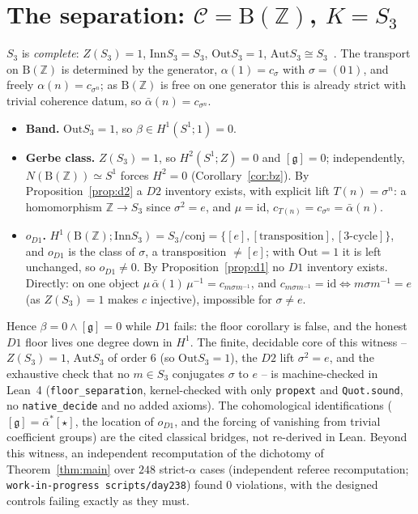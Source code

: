 \documentclass[11pt]{article}
\theoremstyle{definition}
\newcommand{\C}{\mathcal{C}}
\newcommand{\id}{\mathrm{id}}
\newcommand{\Z}{\mathbb{Z}}
\newcommand{\Aut}{\mathrm{Aut}}
\newcommand{\Inn}{\mathrm{Inn}}
\newcommand{\Out}{\mathrm{Out}}
\newcommand{\gerbe}{\mathfrak{g}}
\newcommand{\abar}{\bar{\alpha}}
\newcommand{\B}{\mathrm{B}}
\begin{document}
\section{The separation: $\C=\B(\Z)$, $K=S_3$}\label{sec:sep}

$S_3$ is \emph{complete}: $Z(S_3)=1$, $\Inn S_3=S_3$, $\Out S_3=1$, $\Aut S_3\cong
S_3$~\cite[Thm 7.5]{rotman}. The transport on $\B(\Z)$ is determined by the generator,
$\alpha(1)=c_\sigma$ with $\sigma=(0\,1)$, and freely $\alpha(n)=c_{\sigma^n}$; as $\B(\Z)$
is free on one generator this is already strict with trivial coherence datum, so
$\abar(n)=c_{\sigma^n}$.

\begin{itemize}
\item \textbf{Band.} $\Out S_3=1$, so $\beta\in H^1(S^1;1)=0$. \checkmark
\item \textbf{Gerbe class.} $Z(S_3)=1$, so $H^2(S^1;Z)=0$ and $[\gerbe]=0$; independently,
$N(\B(\Z))\simeq S^1$ forces $H^2=0$ (Corollary~\ref{cor:bz}). By
Proposition~\ref{prop:d2} a $D2$ inventory exists, with explicit lift $T(n)=\sigma^n$: a
homomorphism $\Z\to S_3$ since $\sigma^2=e$, and $\mu=\id$, $c_{T(n)}=c_{\sigma^n}=\abar(n)$.
\checkmark
\item \textbf{$o_{D1}$.} $H^1(\B(\Z);\Inn S_3)=S_3/\mathrm{conj}=\{[e],[\text{transposition}],
[\text{3-cycle}]\}$, and $o_{D1}$ is the class of $\sigma$, a transposition $\neq[e]$; with
$\Out=1$ it is left unchanged, so $o_{D1}\neq 0$. By Proposition~\ref{prop:d1} no $D1$
inventory exists. Directly: on one object $\mu\,\abar(1)\,\mu^{-1}=c_{m\sigma m^{-1}}$, and
$c_{m\sigma m^{-1}}=\id\iff m\sigma m^{-1}=e$ (as $Z(S_3)=1$ makes $c$ injective),
impossible for $\sigma\neq e$. \checkmark
\end{itemize}

Hence $\beta=0\wedge[\gerbe]=0$ while $D1$ fails: the floor corollary is false, and the
honest $D1$ floor lives one degree down in $H^1$. The finite, decidable core of this
witness -- $Z(S_3)=1$, $\Aut S_3$ of order $6$ (so $\Out S_3=1$), the $D2$ lift $\sigma^2=e$,
and the exhaustive check that no $m\in S_3$ conjugates $\sigma$ to $e$ -- is machine-checked
in Lean~4 (\texttt{floor\_separation}, kernel-checked with only \texttt{propext} and
\texttt{Quot.sound}, no \texttt{native\_decide} and no added axioms). The cohomological
identifications ($[\gerbe]=\abar^{*}[\star]$, the location of $o_{D1}$, and the forcing of
vanishing from trivial coefficient groups) are the cited classical bridges, not re-derived
in Lean. Beyond this witness, an independent recomputation of the dichotomy of
Theorem~\ref{thm:main} over $248$ strict-$\alpha$ cases (independent referee recomputation;
\texttt{work-in-progress scripts/day238}) found $0$ violations, with the designed controls
failing exactly as they must.
\end{document}
